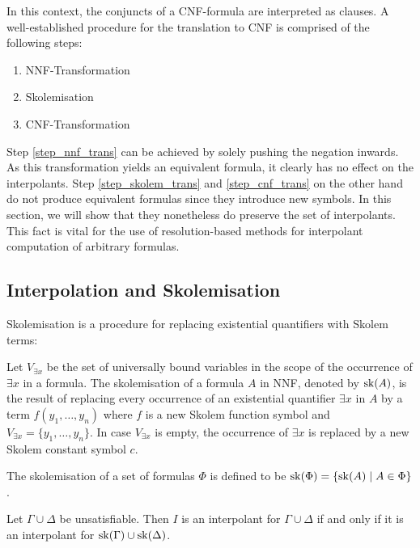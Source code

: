 In this context, the conjuncts of a CNF-formula are interpreted as clauses.
A well-established procedure for the translation to CNF is comprised of the following steps:

\begin{enumerate}
		\item NNF-Transformation \label{step_nnf_trans}
		\item Skolemisation \label{step_skolem_trans}
		\item CNF-Transformation \label{step_cnf_trans}
\end{enumerate}

Step \ref{step_nnf_trans} can be achieved by solely pushing the negation inwards.
As this transformation yields an equivalent formula, it clearly has no effect on the interpolants.
Step \ref{step_skolem_trans} and \ref{step_cnf_trans} on the other hand do not produce equivalent formulas since they introduce new symbols.
In this section, we will show that they nonetheless do preserve the set of interpolants.
This fact is vital for the use of resolution-based methods for interpolant computation of arbitrary formulas.


\subsection{Interpolation and Skolemisation}

Skolemisation is a procedure for replacing existential quantifiers with Skolem terms:

\begin{defi}
	Let $V_{\exists x}$ be the set of universally bound variables in the scope of the occurrence of $\exists x$ in a formula.
	The skolemisation of a formula $A$ in NNF, denoted by $\operatorname{sk}(A)$, is the result of replacing every occurrence of an existential quantifier $\exists x$ in $A$ by a term $f(y_1, \ldots, y_n)$ where $f$ is a new Skolem function symbol and $V_{\exists x} = \{y_1, \ldots, y_n\}$.
	In case $V_{\exists x}$ is empty, the occurrence of $\exists x$ is replaced by a new Skolem constant symbol $c$.

	The skolemisation of a set of formulas $\Phi$ is defined to be $\operatorname{sk}(\Phi) = \{ \operatorname{sk}(A) \mid A \in \Phi \}$.
\end{defi}


\begin{prop}
	Let $\Gamma \cup \Delta$ be unsatisfiable.
	Then $I$ is an interpolant for $\Gamma \cup \Delta$ if and only if it is an interpolant for $\operatorname{sk}(\Gamma) \cup \operatorname{sk}(\Delta)$. 
\end{prop}


